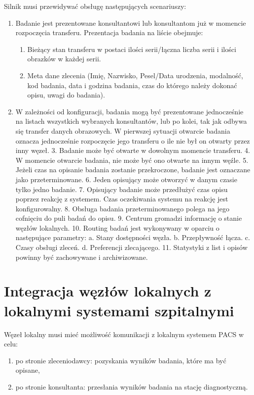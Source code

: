\documentclass[a4paper]{report}
\begin{document}
Silnik musi przewidywać obsługę następujących scenariuszy:
\begin{enumerate}
  \item Badanie jest prezentowane konsultantowi lub konsultantom już w momencie rozpoczęcia transferu. Prezentacja badania na liście obejmuje:
  \begin{enumerate}
    \item Bieżący stan transferu w postaci ilości serii/łączna liczba serii i ilości obrazków w każdej serii.
    \item Meta dane zlecenia (Imię, Nazwisko, Pesel/Data urodzenia, modalność, kod badania, data i godzina badania, czas do którego należy dokonać opisu, uwagi do badania).
  \end{enumerate}

  \item W zależności od konfiguracji, badania mogą być prezentowane jednocześnie na listach wszystkich wybranych konsultantów, lub po kolei, tak jak odbywa się transfer danych obrazowych. W pierwszej sytuacji otwarcie badania oznacza jednocześnie rozpoczęcie jego transferu o ile nie był on otwarty przez inny węzeł.
3. Badanie może być otwarte w dowolnym momencie transferu.
4. W momencie otwarcie badania, nie może być ono otwarte na innym węźle.
5. Jeżeli czas na opisanie badania zostanie przekroczone, badanie jest oznaczane jako przeterminowane.
6. Jeden opisujący może otworzyć w danym czasie tylko jedno badanie.
7. Opisujący badanie może przedłużyć czas opisu poprzez reakcję z systemem. Czas oczekiwania systemu na reakcję jest konfigurowalny.
8. Obsługa badania przeterminowanego polega na jego cofnięciu do puli badań do opisu.
9. Centrum gromadzi informację o stanie węzłów lokalnych.
10. Routing badań jest wykonywany w oparciu o następujące parametry:
a. Stany dostępności węzła.
b. Przepływność łącza.
c. Czasy obsługi zleceń.
d. Preferencji zlecającego.
11. Statystyki z list i opisów powinny być zachowywane i archiwizowane.
\end{enumerate}


\section{Integracja węzłów lokalnych z lokalnymi systemami szpitalnymi}

Węzeł lokalny musi mieć możliwość komunikacji z lokalnym systemem PACS w celu:
\begin{enumerate}
 \item po stronie zleceniodawcy: pozyskania wyników badania, które ma być opisane,
 \item po stronie konsultanta: przesłania wyników badania na stację diagnostyczną.
\end{enumerate}
\end{document}
